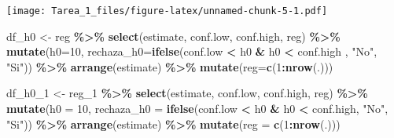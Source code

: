 \documentclass[
]{article}
\newenvironment{Shaded}{\begin{snugshade}}{\end{snugshade}}
\newcommand{\AttributeTok}[1]{\textcolor[rgb]{0.13,0.29,0.53}{#1}}
\newcommand{\DecValTok}[1]{\textcolor[rgb]{0.00,0.00,0.81}{#1}}
\newcommand{\FunctionTok}[1]{\textcolor[rgb]{0.13,0.29,0.53}{\textbf{#1}}}
\newcommand{\NormalTok}[1]{#1}
\newcommand{\OtherTok}[1]{\textcolor[rgb]{0.56,0.35,0.01}{#1}}
\newcommand{\SpecialCharTok}[1]{\textcolor[rgb]{0.81,0.36,0.00}{\textbf{#1}}}
\newcommand{\StringTok}[1]{\textcolor[rgb]{0.31,0.60,0.02}{#1}}
\begin{document}
\texttt{[image: Tarea\_1\_files/figure-latex/unnamed-chunk-5-1.pdf]}

\begin{Shaded}
\begin{Highlighting}[]
\NormalTok{df\_h0 }\OtherTok{\textless{}{-}}\NormalTok{ reg }\SpecialCharTok{\%\textgreater{}\%} 
         \FunctionTok{select}\NormalTok{(estimate, conf.low, conf.high, reg)  }\SpecialCharTok{\%\textgreater{}\%}
         \FunctionTok{mutate}\NormalTok{(}\AttributeTok{h0=}\DecValTok{10}\NormalTok{,}
               \AttributeTok{rechaza\_h0=}\FunctionTok{ifelse}\NormalTok{(conf.low }\SpecialCharTok{\textless{}}\NormalTok{ h0 }\SpecialCharTok{\&}\NormalTok{  h0 }\SpecialCharTok{\textless{}}\NormalTok{ conf.high , }\StringTok{"No"}\NormalTok{, }\StringTok{"Si"}\NormalTok{)) }\SpecialCharTok{\%\textgreater{}\%}
             \FunctionTok{arrange}\NormalTok{(estimate) }\SpecialCharTok{\%\textgreater{}\%}
             \FunctionTok{mutate}\NormalTok{(}\AttributeTok{reg=}\FunctionTok{c}\NormalTok{(}\DecValTok{1}\SpecialCharTok{:}\FunctionTok{nrow}\NormalTok{(.)))}

\NormalTok{df\_h0\_1 }\OtherTok{\textless{}{-}}\NormalTok{ reg\_1 }\SpecialCharTok{\%\textgreater{}\%} 
  \FunctionTok{select}\NormalTok{(estimate, conf.low, conf.high, reg)  }\SpecialCharTok{\%\textgreater{}\%}
  \FunctionTok{mutate}\NormalTok{(}\AttributeTok{h0 =} \DecValTok{10}\NormalTok{,}
         \AttributeTok{rechaza\_h0 =} \FunctionTok{ifelse}\NormalTok{(conf.low }\SpecialCharTok{\textless{}}\NormalTok{ h0 }\SpecialCharTok{\&}\NormalTok{ h0 }\SpecialCharTok{\textless{}}\NormalTok{ conf.high, }\StringTok{"No"}\NormalTok{, }\StringTok{"Si"}\NormalTok{)) }\SpecialCharTok{\%\textgreater{}\%}
  \FunctionTok{arrange}\NormalTok{(estimate) }\SpecialCharTok{\%\textgreater{}\%}
  \FunctionTok{mutate}\NormalTok{(}\AttributeTok{reg =} \FunctionTok{c}\NormalTok{(}\DecValTok{1}\SpecialCharTok{:}\FunctionTok{nrow}\NormalTok{(.)))}



\end{Highlighting}
\end{Shaded}
\end{document}
